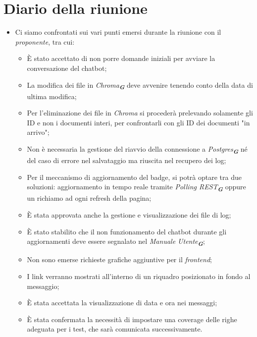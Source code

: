 
\section{Diario della riunione}

\begin{itemize}
    \item Ci siamo confrontati sui vari punti emersi durante la riunione con il \emph{proponente}, tra cui:
    \begin{itemize}
        \item È stato accettato di non porre domande iniziali per avviare la conversazione del chatbot;
        \item La modifica dei file in \emph{Chroma}\textsubscript{\textit{\textbf{G}}} deve avvenire tenendo conto della data di ultima modifica;
        \item Per l’eliminazione dei file in \emph{Chroma} si procederà prelevando solamente gli ID e non i documenti interi, per confrontarli con gli ID dei documenti "in arrivo";
        \item Non è necessaria la gestione del riavvio della connessione a \emph{Postgres}\textsubscript{\textit{\textbf{G}}} né del caso di errore nel salvataggio ma riuscita nel recupero dei log;
        \item Per il meccanismo di aggiornamento del badge, si potrà optare tra due soluzioni: aggiornamento in tempo reale tramite \emph{Polling REST}\textsubscript{\textit{\textbf{G}}} oppure un richiamo ad ogni refresh della pagina;
        \item È stata approvata anche la gestione e visualizzazione dei file di log;
        \item È stato stabilito che il non funzionamento del chatbot durante gli aggiornamenti deve essere segnalato nel \emph{Manuale Utente}\textsubscript{\textit{\textbf{G}}};
        \item Non sono emerse richieste grafiche aggiuntive per il \emph{frontend};
        \item I link verranno mostrati all’interno di un riquadro posizionato in fondo al messaggio;
        \item È stata accettata la visualizzazione di data e ora nei messaggi;
        \item È stata confermata la necessità di impostare una coverage delle righe adeguata per i test, che sarà comunicata successivamente.

\end{itemize}
\end{itemize}
